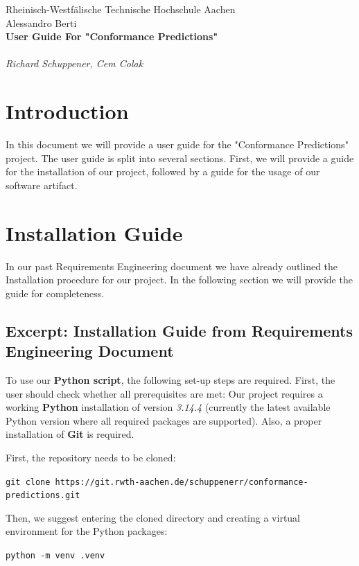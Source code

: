 \documentclass[12pt,a4paper]{article}
\begin{document}
\thispagestyle{empty}
\begin{center}
Rheinisch-Westf\"alische Technische Hochschule Aachen \\
Alessandro Berti\\[6ex]

\LARGE
	\textbf{User Guide For "Conformance Predictions"} \\[6ex]
        \\
	\textit{Richard Schuppener, Cem Colak} \\[6ex]
\end{center}

\newpage

\tableofcontents
\newpage

\section{Introduction}
In this document we will provide a user guide for the "Conformance Predictions" project. The user guide is split into several sections. 
First, we will provide a guide for the installation of our project, followed by a guide for the usage of our software artifact. 

\section{Installation Guide}
In our past Requirements Engineering document we have already outlined the Installation procedure for our project. 
In the following section we will provide the guide for completeness.

\subsection{Excerpt: Installation Guide from Requirements Engineering Document}
To use our \textbf{Python script}, the following set-up steps are required. 
First, the user should check whether all prerequisites are met: 
Our project requires a working \textbf{Python} installation of version \textit{3.14.4} (currently the latest available Python version where all required packages are supported). 
Also, a proper installation of \textbf{Git} is required.

First, the repository needs to be cloned:
\begin{center}
\texttt{git clone https://git.rwth-aachen.de/schuppenerr/conformance-predictions.git}
\end{center}

Then, we suggest entering the cloned directory and creating a virtual environment for the Python packages:
\begin{center}
\texttt{python -m venv .venv}
\end{center}
\end{document}
